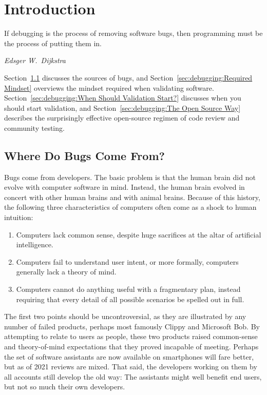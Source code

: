 \section{Introduction}
\label{sec:debugging:Introduction}
%
\epigraph{If debugging is the process of removing software bugs, then
	  programming must be the process of putting them in.}
	 {\emph{Edsger W.~Dijkstra}}

Section~\ref{sec:debugging:Where Do Bugs Come From?}
discusses the sources of bugs, and
Section~\ref{sec:debugging:Required Mindset}
overviews the mindset required when validating software.
Section~\ref{sec:debugging:When Should Validation Start?}
discusses when you should start validation, and
Section~\ref{sec:debugging:The Open Source Way} describes the
surprisingly effective open-source regimen of code review and
community testing.

\subsection{Where Do Bugs Come From?}
\label{sec:debugging:Where Do Bugs Come From?}

Bugs come from developers.
The basic problem is that the human brain did not evolve with computer
software in mind.
Instead, the human brain evolved in concert with other human brains and
with animal brains.
Because of this history, the following three characteristics of computers
often come as a shock to human intuition:

\begin{enumerate}
\item	Computers lack common sense, despite huge sacrifices at the
	altar of artificial intelligence.
\item	Computers fail to understand user intent, or more formally,
	computers generally lack a theory of mind.
\item	Computers cannot do anything useful with a fragmentary plan,
	instead requiring that every detail of all possible scenarios
	be spelled out in full.
\end{enumerate}

The first two points should be uncontroversial, as they are illustrated
by any number of failed products, perhaps most famously Clippy and
Microsoft Bob.
By attempting to relate to users as people, these two products raised
common-sense and theory-of-mind expectations that they proved incapable
of meeting.
Perhaps the set of software assistants are now available on smartphones
will fare better, but as of 2021 reviews are mixed.
That said, the developers working on them by all accounts still develop
the old way: The assistants might well benefit end users, but not so
much their own developers.

